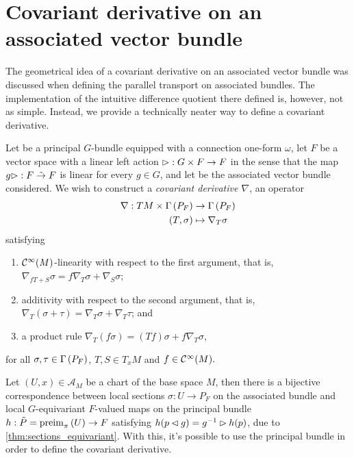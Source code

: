 \section{Covariant derivative on an associated vector bundle}
The geometrical idea of a covariant derivative on an associated vector bundle was discussed when defining the parallel transport on associated bundles. The implementation of the intuitive difference quotient there defined is, however, not as simple. Instead, we provide a technically neater way to define a covariant derivative.

Let  be a principal \(G\)-bundle equipped with a connection one-form \(\omega\), let \(F\) be a vector space with a linear left action \(\mathbin{\vartriangleright} : G \times F \to F\) in the sense that the map \(g \mathbin{\vartriangleright} : F \mathrel{\tilde{\to}} F\) is linear for every \(g \in G\), and let  be the associated vector bundle considered. We wish to construct a \emph{covariant derivative \(\nabla\)}, an operator
\begin{align*}
    \nabla : TM \times \Gamma\left(P_F\right) &\to \Gamma\left(P_F\right)\\
                           (T,\sigma) &\mapsto \nabla_T \sigma
\end{align*}
satisfying
\begin{enumerate}[label=(\alph*)]
    \item \(\mathcal{C}^\infty(M)\)-linearity with respect to the first argument, that is, \(\nabla_{fT + S}\sigma = f \nabla_T \sigma + \nabla_S \sigma\);
    \item additivity with respect to the second argument, that is, \(\nabla_T (\sigma + \tau) = \nabla_T \sigma + \nabla_T \tau\); and
    \item a product rule \(\nabla_T (f \sigma) = (Tf) \sigma + f \nabla_T \sigma\),
\end{enumerate}
for all \(\sigma, \tau \in \Gamma\left(P_F\right)\), \(T, S \in T_xM\) and \(f \in \mathcal{C}^\infty(M).\)

Let \((U, x) \in \mathscr{A}_M\) be a chart of the base space \(M\), then there is a bijective correspondence between local sections \(\sigma : U \to P_F\) on the associated bundle and local \(G\)-equivariant \(F\)-valued maps on the principal bundle \(h : \tilde{P} = \operatorname{preim}_{\pi}{\left(U\right)} \to F\) satisfying \(h(p\mathbin{\vartriangleleft} g) = g^{-1} \mathbin{\vartriangleright} h(p)\), due to \cref{thm:sections_equivariant}. With this, it's possible to use the principal bundle in order to define the covariant derivative.

